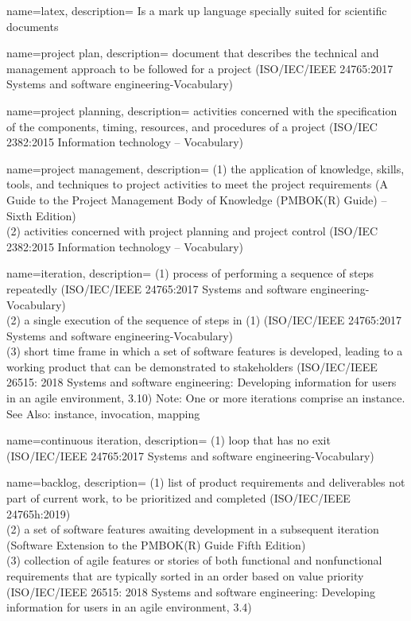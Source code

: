 {
    name=latex,
    description=
    {
        Is a mark up language specially suited for scientific documents
    }
}

{
    name={project plan},
    description=
    {
        document that describes the technical and management approach to be followed for a project (ISO/IEC/IEEE 24765:2017 Systems and software engineering-Vocabulary) 
    }
}

{
    name={project planning},
    description=
    {
        activities concerned with the specification of the components, timing, resources, and procedures of a project (ISO/IEC 2382:2015 Information technology -- Vocabulary)
    }
}

{
    name={project management},
    description=
    {
        (1) the application of knowledge, skills, tools, and techniques to project activities to meet the project requirements (A Guide to the Project Management Body of Knowledge (PMBOK(R) Guide) -- Sixth Edition)\\
        (2) activities concerned with project planning and project control (ISO/IEC 2382:2015 Information technology -- Vocabulary) 
    }
}


{
    name={iteration},
    description=
    {
        (1) process of performing a sequence of steps repeatedly (ISO/IEC/IEEE 24765:2017 Systems and software engineering-Vocabulary) \\
        (2) a single execution of the sequence of steps in (1) (ISO/IEC/IEEE 24765:2017 Systems and software engineering-Vocabulary) \\
        (3) short time frame in which a set of software features is developed, leading to a working product that can be demonstrated to stakeholders (ISO/IEC/IEEE 26515: 2018 Systems and software engineering: Developing information for users in an agile environment, 3.10) Note: One or more iterations comprise an instance. See Also: instance, invocation, mapping
    }
}

{
    name={continuous iteration},
    description=
    {
        (1) loop that has no exit (ISO/IEC/IEEE 24765:2017 Systems and software engineering-Vocabulary)
    }
}

{
    name={backlog},
    description=
    {
        (1) list of product requirements and deliverables not part of current work, to be prioritized and completed (ISO/IEC/IEEE 24765h:2019) \\
        (2) a set of software features awaiting development in a subsequent iteration (Software Extension to the PMBOK(R) Guide Fifth Edition) \\
        (3) collection of agile features or stories of both functional and nonfunctional requirements that are typically sorted in an order based on value priority (ISO/IEC/IEEE 26515: 2018 Systems and software engineering: Developing information for users in an agile environment, 3.4)
    }
}

